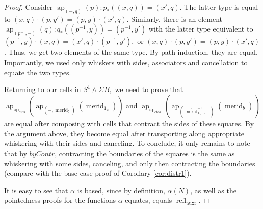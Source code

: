 \documentclass{amsart}
\theoremstyle{definition}
\newcommand{\ap}{\operatorname{ap}}
\newcommand{\refl}{\operatorname{refl}}
\newcommand{\auxr}{\operatorname{auxr}}
\newcommand{\mmerid}{\overline{{\operatorname{merid}}}}
\newcommand{\s}{\mathbf{2}}
\newcommand{\ctos}{\operatorname{ctos}}
\begin{document}
\begin{proof}
Consider $\ap_{(-, q)}(p): p_*((x,q)) = (x',q)$. The latter type is equal to $(x, q) \cdot (p, y') = (p, y) \cdot (x', q)$.
Similarly, there is an element $\ap_{(p^{-1}, -)}(q): q_*((p^{-1},y)) = (p^{-1},y')$ with the latter type equivalent to $(p^{-1},y) \cdot (x, q) = (x', q) \cdot (p^{-1},y'),$ or $(x, q) \cdot (p, y') = (p, y) \cdot (x', q)$. Thus, we get two elements of the same type. By path induction, they are equal. Importantly, we used only whiskers with sides, associators and cancellation to equate the two types.

Returning to our cells in $S^1 \wedge \Sigma B,$ we need to prove that $\ap_{\ap_{\ctos}}(\ap_{(-, \mmerid_b)}(\mmerid_{1_\s}))$ and $\ap_{\ap_{\ctos}}(\ap_{(\mmerid_{1_{\s}}^{-1}, -)}(\mmerid_b))$ are equal after composing with cells that contract the sides of these squares. By the argument above, they become equal after transporting along appropriate whiskering with their sides and canceling. To conclude, it only remains to note that by $byContr$, contracting the boundaries of the squares is the same as whiskering with some sides, canceling, and only then contracting the boundaries (compare with the base case proof of Corollary \ref{cor:distr1}).

It is easy to see that $\alpha$ is based, since by definition, $\alpha (N)$, as well as the pointedness proofs for the functions $\alpha$ equates, equals $\refl_{\auxr}$.
\end{proof}
\end{document}
